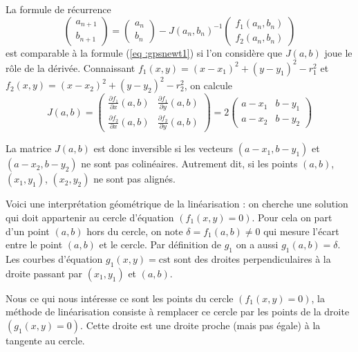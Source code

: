 \documentclass[class=report,crop=false]{standalone}
\begin{document}
La formule de récurrence 
\begin{equation}
\label{eq :gpsnewt2}
\begin{pmatrix}a_{n+1}\\b_{n+1}\end{pmatrix} = \begin{pmatrix}a_n\\b_n\end{pmatrix}-J(a_n,b_n)^{-1}\begin{pmatrix}f_1(a_n,b_n)\\f_2(a_n,b_n)\end{pmatrix}
\end{equation}
est comparable à 
la formule (\ref{eq :gpsnewt1}) si l'on considère que $J(a,b)$ joue le rôle de la dérivée.
Connaissant $f_1(x,y) = (x-x_1)^2+(y-y_1)^2-r_1^2$
et $f_2(x,y) = (x-x_2)^2+(y-y_2)^2-r_2^2$, on calcule
$$J(a,b) = \begin{pmatrix}
  \frac{\partial f_1}{\partial x}(a,b) & \frac{\partial f_1}{\partial y}(a,b) \\
  \frac{\partial f_2}{\partial x}(a,b) & \frac{\partial f_2}{\partial y}(a,b)
  \end{pmatrix}
  = 2 \begin{pmatrix}a-x_1&b-y_1\\a-x_2&b-y_2\end{pmatrix}$$

La matrice $J(a,b)$ est donc inversible si les vecteurs
$(a-x_1,b-y_1)$ et $(a-x_2,b-y_2)$ ne sont pas colinéaires.
Autrement dit, si les points
$(a,b)$, $(x_1,y_1)$, $(x_2,y_2)$ ne sont pas alignés.



Voici une interprétation géométrique de la linéarisation  :
on cherche une solution qui doit appartenir au cercle d'équation $(f_1(x,y)=0)$.
Pour cela on part d'un point $(a,b)$ hors du cercle, on note
$\delta = f_1(a,b) \neq 0$ qui mesure l'écart entre le point $(a,b)$ 
et le cercle.
Par définition de $g_1$ on a aussi $g_1(a,b)=\delta$.
Les courbes d'équation $g_1(x,y)= \text{cst}$ sont des droites
perpendiculaires à la droite passant par $(x_1,y_1)$ et $(a,b)$.

Nous ce qui nous intéresse ce sont les points du cercle $(f_1(x,y)=0)$,
la méthode de linéarisation consiste à remplacer ce cercle par 
les points de la droite $(g_1(x,y)=0)$. Cette droite 
est une droite proche (mais pas égale) à la tangente au cercle.

\end{document}
